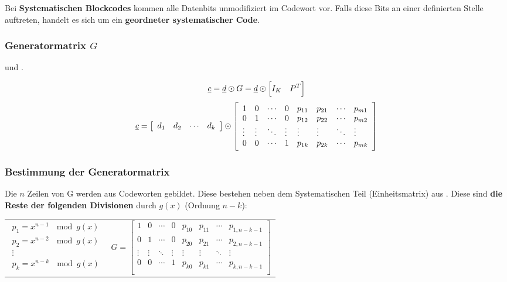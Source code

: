 \documentclass[a4paper]{article}
\begin{document}
\begin{twocolumn}
Bei \textbf{Systematischen Blockcodes} kommen alle Datenbits unmodifiziert im Codewort vor. 
Falls diese Bits an einer definierten Stelle auftreten, handelt es sich um ein \textbf{geordneter systematischer Code}.

\subsubsection{Generatormatrix $G$}
 und .

$$\underline{c} = \underline{d} \odot G = \underline{d} \odot \left[ I_K \quad P^T \right]$$
$$\underline{c} = \left[ \begin{array}{llll} d_1 & d_2 & \cdots & d_k \end{array} \right] \odot 
  \left[ \begin{array}{llllllll} 
    1 & 0 & \cdots & 0 & p_{11} & p_{21} & \cdots & p_{m1} \\
    0 & 1 & \cdots & 0 & p_{12} & p_{22} & \cdots & p_{m2} \\
    \vdots & \vdots & \ddots & \vdots & \vdots & \vdots & \ddots & \vdots \\
    0 & 0 & \cdots & 1 & p_{1k} & p_{2k} & \cdots & p_{mk} \\
  \end{array} \right]
$$

\subsubsection{Bestimmung der Generatormatrix}
Die $n$ Zeilen von G werden aus Codeworten gebildet. 
Diese bestehen neben dem Systematischen Teil (Einheitsmatrix) aus . 
Diese sind \textbf{die Reste der folgenden Divisionen} durch $g(x)$ (Ordnung $n-k$):

\begin{tabularx}{\columnwidth}{cc}
$$\begin{array}{c}
  p_1 = x^{n-1} \: \mod g(x) \\
  p_2 = x^{n-2} \: \mod g(x) \\
  \vdots  \\
  p_k = x^{n-k} \: \mod g(x) \\
\end{array}$$ &
$$G=\left[ \begin{array}{llllllll} 
  1 & 0 & \cdots & 0 & p_{10} & p_{11} & \cdots & p_{1,n-k-1} \\
  0 & 1 & \cdots & 0 & p_{20} & p_{21} & \cdots & p_{2,n-k-1} \\
  \vdots & \vdots & \ddots & \vdots & \vdots & \vdots & \ddots & \vdots \\
  0 & 0 & \cdots & 1 & p_{k0} & p_{k1} & \cdots & p_{k,n-k-1} \\
\end{array} \right]$$
\end{tabularx}


\end{twocolumn}
\end{document}
